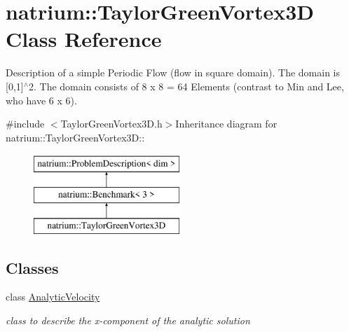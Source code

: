 \hypertarget{classnatrium_1_1TaylorGreenVortex3D}{
\section{natrium::TaylorGreenVortex3D Class Reference}
\label{classnatrium_1_1TaylorGreenVortex3D}
}


Description of a simple Periodic Flow (flow in square domain). The domain is \mbox{[}0,1\mbox{]}$^\wedge$2. The domain consists of 8 x 8 = 64 Elements (contrast to Min and Lee, who have 6 x 6).  


{\ttfamily \#include $<$TaylorGreenVortex3D.h$>$}Inheritance diagram for natrium::TaylorGreenVortex3D::\begin{figure}[H]
\begin{center}
\leavevmode
\includegraphics[height=3cm]{classnatrium_1_1TaylorGreenVortex3D}
\end{center}
\end{figure}
\subsection*{Classes}
\begin{DoxyCompactItemize}
\item 
class \hyperlink{classnatrium_1_1TaylorGreenVortex3D_1_1AnalyticVelocity}{AnalyticVelocity}
\begin{DoxyCompactList}\small\item\em class to describe the x-\/component of the analytic solution \item\end{DoxyCompactList}\end{DoxyCompactItemize}
